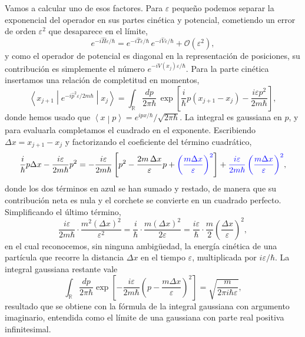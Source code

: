        Vamos a calcular uno de esos factores. Para $\varepsilon$ pequeño podemos separar la exponencial del operador en sus partes cinética y potencial, cometiendo un error de orden $\varepsilon^{2}$ que desaparece en el límite,
        \begin{equation}\label{eq:SeparacionExponencial}
            e^{-i\hat{H}\varepsilon/\hbar} = e^{-i\hat{T}\varepsilon/\hbar}\,e^{-i\hat{V}\varepsilon/\hbar} + \mathcal{O}\left(\varepsilon^{2}\right),
        \end{equation}
        y como el operador de potencial es diagonal en la representación de posiciones, su contribución es simplemente el número $e^{-iV(x_{j})\varepsilon/\hbar}$. Para la parte cinética insertamos una relación de completitud en momentos,
        \begin{equation}\label{eq:CineticoMomentos}
            \left\langle x_{j+1}\middle|e^{-i\hat{p}^{2}\varepsilon/2m\hbar}\middle|x_{j}\right\rangle
            = \int_{\mathbb{R}}\frac{dp}{2\pi\hbar}\,\exp\left[\frac{i}{\hbar}p\left(x_{j+1}-x_{j}\right) - \frac{i\varepsilon p^{2}}{2m\hbar}\right],
        \end{equation}
        donde hemos usado que $\left\langle x\middle|p\right\rangle = e^{ipx/\hbar}/\sqrt{2\pi\hbar}$. La integral es gaussiana en $p$, y para evaluarla completamos el cuadrado en el exponente. Escribiendo $\Delta x = x_{j+1}-x_{j}$ y factorizando el coeficiente del término cuadrático,
        \begin{equation}\label{eq:CompletarCuadrado}
            \frac{i}{\hbar}p\Delta x - \frac{i\varepsilon}{2m\hbar}p^{2}
            = -\frac{i\varepsilon}{2m\hbar}\left[p^{2} - \frac{2m\,\Delta x}{\varepsilon}p + \textcolor{blue}{\left(\frac{m\Delta x}{\varepsilon}\right)^{2}}\right] + \textcolor{blue}{\frac{i\varepsilon}{2m\hbar}\left(\frac{m\Delta x}{\varepsilon}\right)^{2}},
        \end{equation}
        donde los dos términos en azul se han sumado y restado, de manera que su contribución neta es nula y el corchete se convierte en un cuadrado perfecto. Simplificando el último término,
        \begin{equation}\label{eq:TerminoSobrante}
            \frac{i\varepsilon}{2m\hbar}\cdot\frac{m^{2}\left(\Delta x\right)^{2}}{\varepsilon^{2}} = \frac{i}{\hbar}\cdot\frac{m\left(\Delta x\right)^{2}}{2\varepsilon}
            = \frac{i\varepsilon}{\hbar}\cdot\frac{m}{2}\left(\frac{\Delta x}{\varepsilon}\right)^{2},
        \end{equation}
        en el cual reconocemos, sin ninguna ambigüedad, la energía cinética de una partícula que recorre la distancia $\Delta x$ en el tiempo $\varepsilon$, multiplicada por $i\varepsilon/\hbar$. La integral gaussiana restante vale
        \begin{equation}\label{eq:GaussianaP}
            \int_{\mathbb{R}}\frac{dp}{2\pi\hbar}\exp\left[-\frac{i\varepsilon}{2m\hbar}\left(p - \frac{m\Delta x}{\varepsilon}\right)^{2}\right] = \sqrt{\frac{m}{2\pi i\hbar\varepsilon}},
        \end{equation}
        resultado que se obtiene con la fórmula de la integral gaussiana con argumento imaginario, entendida como el límite de una gaussiana con parte real positiva infinitesimal.

